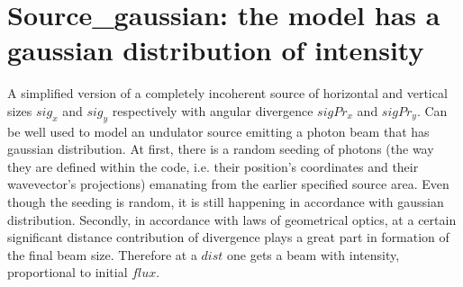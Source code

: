 \section{Source\_gaussian: the model has a gaussian distribution of intensity}
\label{source-gaussian}

A simplified version of a completely incoherent source of horizontal and vertical sizes $sig_x$ and $sig_y$ respectively with angular divergence $sigPr_x$ and $sigPr_y$. Can be well used to model an undulator source emitting a photon beam that has gaussian distribution.
At first, there is a random seeding of photons (the way they are defined within the code, i.e. their position's coordinates and their wavevector's projections) emanating from the earlier specified source area. Even though the seeding is random, it is still happening in accordance with gaussian distribution. 
Secondly, in accordance with laws of geometrical optics, at a certain significant distance contribution of divergence plays a great part in formation of the final beam size.
Therefore at a $dist$ one gets a beam with intensity, proportional to initial $flux$. 
